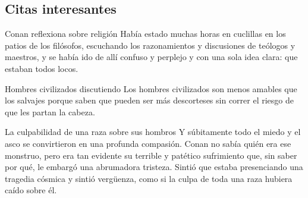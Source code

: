 \subsection{Citas interesantes}

\begin{frame}{}
\begin{exampleblock}{Conan reflexiona sobre religión}
Había estado muchas horas en cuclillas en los patios de los filósofos, escuchando los razonamientos y discusiones de teólogos y maestros, y se había ido de allí confuso y perplejo y con una sola idea clara: que estaban todos locos.
\end{exampleblock}
\end{frame}

\begin{frame}{}
\begin{exampleblock}{Hombres civilizados discutiendo}
Los hombres civilizados son menos amables que los salvajes porque saben que pueden ser más descorteses sin correr el riesgo de que les partan la cabeza.
\end{exampleblock}
\end{frame}

\begin{frame}{}
\begin{exampleblock}{La culpabilidad de una raza sobre sus hombros}
Y súbitamente todo el miedo y el asco se convirtieron en una profunda compasión. Conan no sabía quién era ese monstruo, pero era tan evidente su terrible y patético sufrimiento que, sin saber por qué, le embargó una abrumadora tristeza. Sintió que estaba presenciando una tragedia cósmica y sintió vergüenza, como si la culpa de toda una raza hubiera caído sobre él.
\end{exampleblock}
\end{frame}

